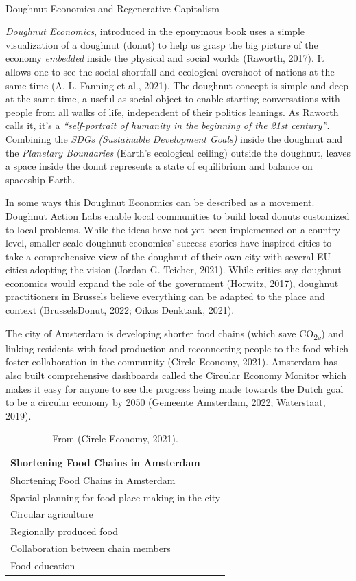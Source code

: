 \documentclass[
  letterpaper,
  DIV=11,
  numbers=noendperiod]{scrartcl}
\makeatletter
\let\oldparagraph\paragraph
\renewcommand{\paragraph}{
    \@ifstar
      \xxxParagraphStar
      \xxxParagraphNoStar
  }
\newcommand{\xxxParagraphStar}[1]{\oldparagraph*{#1}\mbox{}}
\newcommand{\xxxParagraphNoStar}[1]{\oldparagraph{#1}\mbox{}}
\makeatother
\begin{document}
\paragraph{Doughnut Economics and Regenerative
Capitalism}\label{doughnut-economics-and-regenerative-capitalism}

\emph{Doughnut Economics}, introduced in the eponymous book uses a
simple visualization of a doughnut (donut) to help us grasp the big
picture of the economy \emph{embedded} inside the physical and social
worlds (Raworth, 2017). It allows one to see the social shortfall and
ecological overshoot of nations at the same time (A. L. Fanning et al.,
2021). The doughnut concept is simple and deep at the same time, a
useful as social object to enable starting conversations with people
from all walks of life, independent of their politics leanings. As
Raworth calls it, it's a \emph{``self-portrait of humanity in the
beginning of the 21st century''\textbf{.}} Combining the \emph{SDGs
(Sustainable Development Goals)} inside the doughnut and the
\emph{Planetary Boundaries} (Earth's ecological ceiling) outside the
doughnut, leaves a space inside the donut represents a state of
equilibrium and balance on spaceship Earth.

In some ways this Doughnut Economics can be described as a movement.
Doughnut Action Labs enable local communities to build local donuts
customized to local problems. While the ideas have not yet been
implemented on a country-level, smaller scale doughnut economics'
success stories have inspired cities to take a comprehensive view of the
doughnut of their own city with several EU cities adopting the vision
(Jordan G. Teicher, 2021). While critics say doughnut economics would
expand the role of the government (Horwitz, 2017), doughnut
practitioners in Brussels believe everything can be adapted to the place
and context (BrusselsDonut, 2022; Oikos Denktank, 2021).

The city of Amsterdam is developing shorter food chains (which save
CO\textsubscript{2e}) and linking residents with food production and
reconnecting people to the food which foster collaboration in the
community (Circle Economy, 2021). Amsterdam has also built comprehensive
dashboards called the Circular Economy Monitor which makes it easy for
anyone to see the progress being made towards the Dutch goal to be a
circular economy by 2050 (Gemeente Amsterdam, 2022; Waterstaat, 2019).

\begin{longtable}[]{@{}l@{}}
\caption{From (Circle Economy, 2021).}\tabularnewline
\toprule\noalign{}
Shortening Food Chains in Amsterdam \\
\midrule\noalign{}
\endfirsthead
\toprule\noalign{}
Shortening Food Chains in Amsterdam \\
\midrule\noalign{}
\endhead
\bottomrule\noalign{}
\endlastfoot
Spatial planning for food place-making in the city \\
Circular agriculture \\
Regionally produced food \\
Collaboration between chain members \\
Food education \\
\end{longtable}
\end{document}
